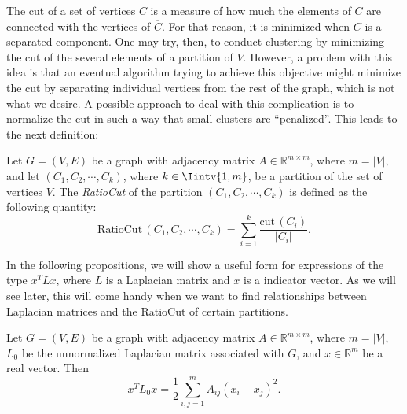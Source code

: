 The cut of a set of vertices $C$ is a measure of how much the elements of $C$ are connected with the vertices of $\overline C$.
For that reason, it is minimized when $C$ is a separated component. 
One may try, then, to conduct clustering by minimizing the cut of the several elements of a partition of $V$.
However, a problem with this idea is that an eventual algorithm trying to achieve this objective might minimize the cut by separating individual vertices from the rest of the graph, which is not what we desire.
A possible approach to deal with this complication is to normalize the cut in such a way that small clusters are ``penalized''.
This leads to the next definition:

\begin{definition}
   Let $G = (V,E)$ be a graph with adjacency matrix $A \in \mathbb R^{m \times m}$, where $m = |V|$, and let $(C_1, C_2, \cdots, C_k)$, where $k \in \Iintv{1,m}$, be a partition of the set of vertices $V$.
   The \textit{RatioCut} of the partition $(C_1, C_2, \cdots, C_k)$ is defined as the following quantity:
   \begin{equation}
      \text{RatioCut}\, (C_1, C_2, \cdots, C_k) = \sum _{i = 1}^k \frac{\text{cut}\, (C_i)}{|C_i|}.
   \end{equation}
\end{definition}

In the following propositions, we will show a useful form for expressions of the type $x^TLx$, where $L$ is a Laplacian matrix and $x$ is a indicator vector.
As we will see later, this will come handy when we want to find relationships between Laplacian matrices and the RatioCut of certain partitions.

\begin{proposition}
   Let $G = (V,E)$ be a graph with adjacency matrix $A \in \mathbb R^{m \times m}$, where $m = |V|$, $L_0$ be the unnormalized Laplacian matrix associated with $G$, and $x \in \mathbb R^m$ be a real vector. Then
   \begin{equation}
      x^TL_0x = \frac{1}{2}\sum_{i,j = 1}^m A_{ij} (x_i - x_j)^2.
   \end{equation}
\end{proposition}

